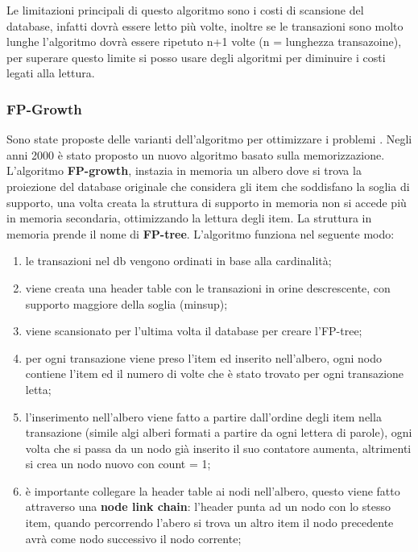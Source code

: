 \documentclass[12pt]{article}
\begin{document}
Le limitazioni principali di questo algoritmo sono i costi di scansione del database, infatti dovr\`a essere letto pi\`u volte, inoltre se le transazioni sono molto lunghe l'algoritmo dovr\`a essere ripetuto n+1 volte (n = lunghezza transazoine), per superare questo limite si posso usare degli algoritmi per diminuire i costi legati alla lettura.


\subsubsection{FP-Growth}
Sono state proposte delle varianti dell'algoritmo per ottimizzare i problemi . Negli anni 2000 \`e stato proposto un nuovo algoritmo basato sulla memorizzazione. L'algoritmo \textbf{FP-growth}, instazia in memoria un albero dove si trova la proiezione del database originale che considera gli item che soddisfano la soglia di supporto, una volta creata la struttura di supporto in memoria non si accede pi\`u in memoria secondaria, ottimizzando la lettura degli item. La struttura in memoria prende il nome di \textbf{FP-tree}. L'algoritmo funziona nel seguente modo:
\begin{enumerate}
    \item le transazioni nel db vengono ordinati in base alla cardinalit\`a;
    \item viene creata una header table con le transazioni in orine descrescente, con supporto maggiore della soglia (minsup);
    \item viene scansionato per l'ultima volta il database per creare l'FP-tree;
    \item per ogni transazione viene preso l'item ed inserito nell'albero, ogni nodo contiene l'item ed il numero di volte che \`e stato trovato per ogni transazione letta;
    \item l'inserimento nell'albero viene fatto a partire dall'ordine degli item nella transazione (simile algi alberi formati a partire da ogni lettera di parole), ogni volta che si passa da un nodo gi\`a inserito il suo contatore aumenta, altrimenti si crea un nodo nuovo con count = 1;
    \item \`e importante collegare la header table ai nodi nell'albero, questo viene fatto attraverso una \textbf{node link chain}: l'header punta ad un nodo con lo stesso item, quando percorrendo l'abero si trova un altro item il nodo precedente avr\`a come nodo successivo il nodo corrente;
\end{enumerate}
\end{document}
